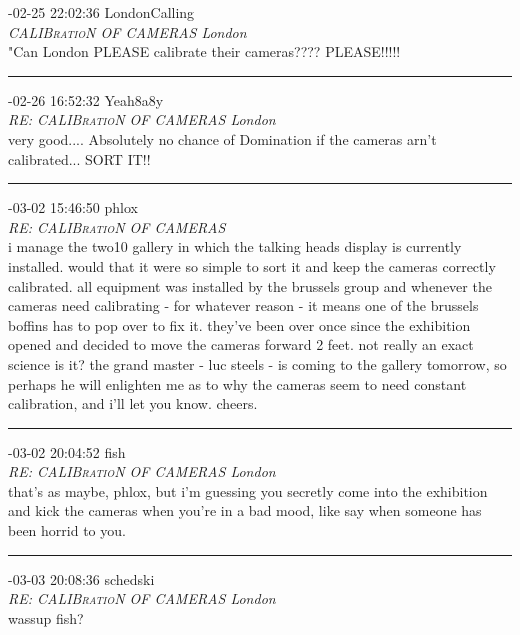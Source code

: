 \begin{mail}

{-02-25 22:02:36 LondonCalling}\\
{\itshape CALIB\textsc{ratio}N OF CAMERAS London}\\
"Can London PLEASE calibrate their cameras???? PLEASE!!!!!\\

\rule{0.8\textwidth}{.4pt}

{-02-26 16:52:32 Yeah8a8y}\\
{\itshape RE: CALIB\textsc{ratio}N OF CAMERAS London}\\
very good.... Absolutely no chance of Domination if the cameras arn't calibrated... SORT IT!!\\

\rule{0.8\textwidth}{.4pt}

{-03-02 15:46:50} phlox\\
{\itshape RE: CALIB\textsc{ratio}N OF CAMERAS}\\
i manage the two10 gallery in which the talking heads display is currently installed. would that it were so simple to sort it and keep the cameras correctly calibrated. all equipment was installed by the brussels group and whenever the cameras need calibrating - for whatever reason - it means one of the brussels boffins has to pop over to fix it. they've been over once since the exhibition opened and decided to move the cameras forward 2 feet. not really an exact science is it? the grand master - luc steels - is coming to the gallery tomorrow, so perhaps he will enlighten me as to why the cameras seem to need constant calibration, and i'll let you know. cheers.\\

\rule{0.8\textwidth}{.4pt}

{-03-02 20:04:52 fish}\\
{\itshape RE: CALIB\textsc{ratio}N OF CAMERAS London}\\
that's as maybe, phlox, but i'm guessing you secretly come into the exhibition and kick the cameras when 
you're in a bad mood, like say when someone has been horrid to you.\\

\rule{0.8\textwidth}{.4pt}

{-03-03 20:08:36 schedski}\\
{\itshape RE: CALIB\textsc{ratio}N OF CAMERAS London}\\
wassup fish?\\


\end{mail}
